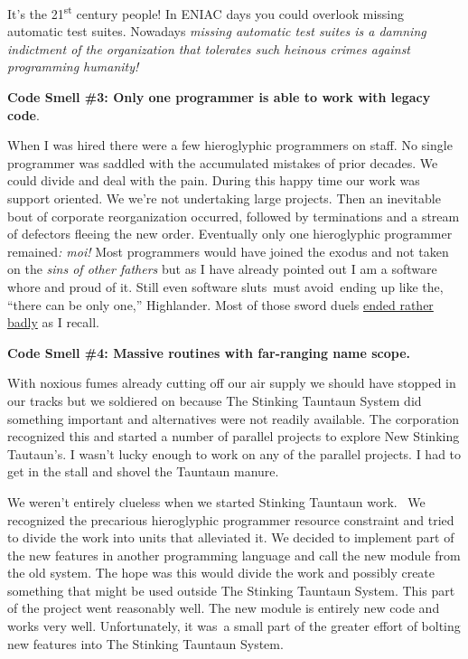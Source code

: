 It's the 21\textsuperscript{st} century people! In ENIAC days you could
overlook missing automatic test suites. Nowadays \emph{missing automatic
test suites is a damning indictment of the organization that tolerates
such heinous crimes against programming humanity!}

\medskip
\noindent\textbf{Code Smell \#3: Only one programmer is able to work with legacy
code}.
\medskip

When I was hired there were a few hieroglyphic programmers on staff. No
single programmer was saddled with the accumulated mistakes of prior
decades. We could divide and deal with the pain. During this happy time
our work was support oriented. We we're not undertaking large projects.
Then an inevitable bout of corporate reorganization occurred, followed
by terminations and a stream of defectors fleeing the new order.
Eventually only one hieroglyphic programmer remained\emph{: moi!} Most
programmers would have joined the exodus and not taken on the \emph{sins
of other fathers} but as I have already pointed out I am a software
whore and proud of it. Still even software sluts~must avoid~ending up
like the, ``there can be only one,'' Highlander. Most of those sword
duels \href{https://www.youtube.com/watch?v=_j6_H-PSml0}{ended rather
badly} as I recall.

\medskip
\noindent\textbf{Code Smell \#4: Massive routines with far-ranging name scope.}
\medskip

With noxious fumes already cutting off our air supply we should have
stopped in our tracks but we soldiered on because The Stinking Tauntaun
System did something important and alternatives were not readily
available. The corporation recognized this and started a number of
parallel projects to explore New Stinking Tautaun's. I wasn't lucky
enough to work on any of the parallel projects. I had to get in the
stall and shovel the Tauntaun manure.

We weren't entirely clueless when we started Stinking Tauntaun work.~ We
recognized the precarious hieroglyphic programmer resource constraint
and tried to divide the work into units that alleviated it. We decided
to implement part of the new features in another programming language
and call the new module from the old system. The hope was this would
divide the work and possibly create something that might be used outside
The Stinking Tauntaun System. This part of the project went reasonably
well. The new module is entirely new code and works very well.
Unfortunately, it was~a small part of the greater effort of bolting new
features into The Stinking Tauntaun System.

